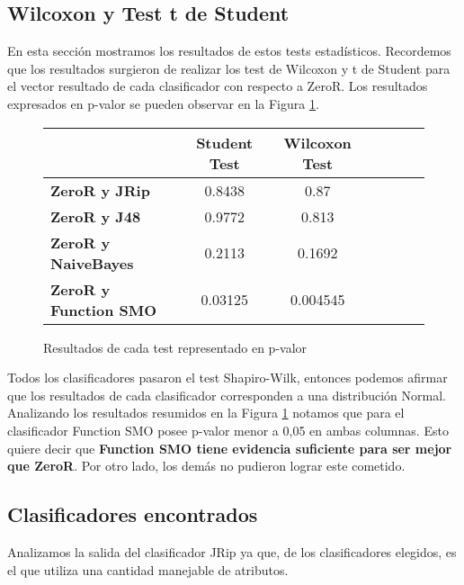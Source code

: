\subsection{Wilcoxon y Test t de Student}

En esta sección mostramos los resultados de estos tests estadísticos. Recordemos que los resultados surgieron de realizar los test de Wilcoxon y t de Student para el vector resultado de cada clasificador con respecto a ZeroR. Los resultados expresados en p-valor se pueden observar en la Figura \ref{res_tests_wilcoxon_student}.


\begin{figure}[H]
\begin{table}[H]
\centering
\begin{tabular}{|l|c|c|c|c|c|c|}
\hline
\textbf{}  & \textbf{Student Test} & \textbf{Wilcoxon Test} \\ \hline
\textbf{ZeroR y JRip}  & 0.8438 & 0.87 \\ \hline
\textbf{ZeroR y J48}  & 0.9772 & 0.813 \\ \hline
\textbf{ZeroR y NaiveBayes}  & 0.2113 & 0.1692 \\ \hline
\textbf{ZeroR y Function SMO}  & 0.03125 & 0.004545 \\ \hline
\end{tabular}
\end{table}
\caption{Resultados de cada test representado en p-valor}
\label{res_tests_wilcoxon_student}
\end{figure}

Todos los clasificadores pasaron el test Shapiro-Wilk, entonces podemos afirmar que los resultados de cada clasificador corresponden a una distribución Normal. Analizando los resultados resumidos en la Figura \ref{res_tests_wilcoxon_student} notamos que para el clasificador Function SMO posee p-valor menor a 0,05 en ambas columnas. Esto quiere decir que \textbf{Function SMO tiene evidencia suficiente para ser mejor que ZeroR}. Por otro lado, los demás no pudieron lograr este cometido. 

\subsection{Clasificadores encontrados}

Analizamos la salida del clasificador JRip ya que, de los clasificadores elegidos, es el que utiliza una cantidad manejable de atributos. 

